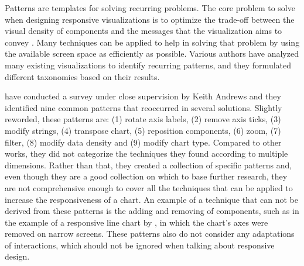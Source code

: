Patterns are templates for solving recurring problems. The core problem to solve when designing responsive visualizations is to optimize the trade-off between the visual density of components and the messages that the visualization aims to convey \parencite{DesignPatternsTradeOffsRespVis}. Many techniques can be applied to help in solving that problem by using the available screen space as efficiently as possible. Various authors have analyzed many existing visualizations to identify recurring patterns, and they formulated different taxonomies based on their results.

\cite{RespVisSurvey} have conducted a survey under close supervision by Keith Andrews \parencite{RespVis} and they identified nine common patterns that reoccurred in several solutions. Slightly reworded, these patterns are: (1) rotate axis labels, (2) remove axis ticks, (3) modify strings, (4) transpose chart, (5) reposition components, (6) zoom, (7) filter, (8) modify data density and (9) modify chart type. Compared to other works, they did not categorize the techniques they found according to multiple dimensions. Rather than that, they created a collection of specific patterns and, even though they are a good collection on which to base further research, they are not comprehensive enough to cover all the techniques that can be applied to increase the responsiveness of a chart. An example of a technique that can not be derived from these patterns is the adding and removing of components, such as in the example of a responsive line chart by \cite{RespVis}, in which the chart's axes were removed on narrow screens. These patterns also do not consider any adaptations of interactions, which should not be ignored when talking about responsive design.

